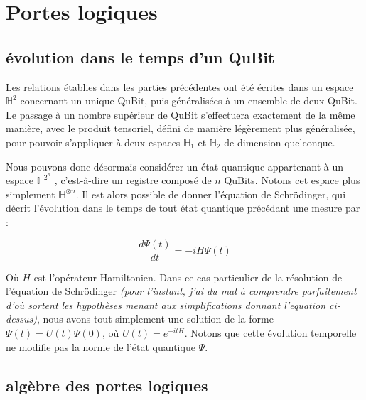 \documentclass[a4paper,12pt]{report}
\begin{document}
	\section{Portes logiques}

		\subsection{évolution dans le temps d'un QuBit}

\par{
	Les relations établies dans les parties précédentes ont été écrites dans un espace $\mathbb{H}^2$ concernant un unique QuBit, puis généralisées à un ensemble de deux QuBit. Le passage à un nombre supérieur de QuBit s'effectuera exactement de la même manière, avec le produit tensoriel, défini de manière légèrement plus généralisée, pour pouvoir s'appliquer à deux espaces $\mathbb{H}_{1}$ et $\mathbb{H}_{2}$ de dimension quelconque.
}

\vspace{1\baselineskip}

\par{
	Nous pouvons donc désormais considérer un état quantique appartenant à un espace $\mathbb{H}^{2^n}$ , c'est-à-dire un registre composé de $n$ QuBits. Notons cet espace plus simplement $\mathbb{H}^{\otimes n}$. Il est alors possible de donner l'équation de Schrödinger, qui décrit l'évolution dans le temps de tout état quantique précédant une mesure par :
}

\begin{equation}
	\frac{d \Psi(t)}{dt} = -i H \Psi(t)
\end{equation}

\vspace{1\baselineskip}

\par{
	Où $H$ est l'opérateur Hamiltonien. Dans ce cas particulier de la résolution de l'équation de Schrödinger \emph{(pour l'instant, j'ai du mal à comprendre parfaitement d'où sortent les hypothèses menant aux simplifications donnant l'equation ci-dessus)}, nous avons tout simplement une solution de la forme $\Psi(t) = U(t) \Psi(0)$, où $U(t) = e^{-itH}$. Notons que cette évolution temporelle ne modifie pas la norme de l'état quantique $\Psi$.
}

		\subsection{algèbre des portes logiques}
\end{document}
